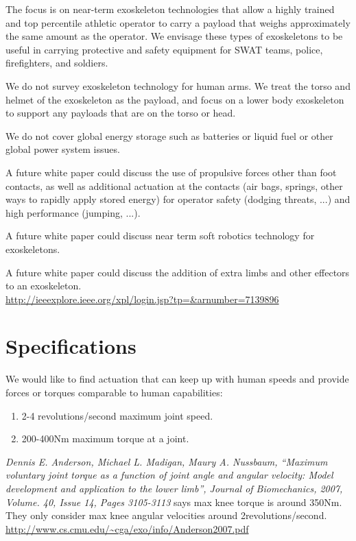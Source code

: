 \documentclass[letterpaper,12pt,fullpage]{article}
\begin{document}
The focus is on near-term exoskeleton technologies that allow a
highly trained and top percentile athletic 
operator to carry a payload that weighs approximately the same amount
as the operator. We envisage these types of exoskeletons to be useful
in carrying protective and safety equipment for SWAT teams, police,
firefighters, and soldiers. 

We do not survey exoskeleton technology for human arms. 
We treat the torso and helmet of the exoskeleton as the payload,
and focus on a lower body exoskeleton to support any payloads that
are on the torso or head.

We do not cover global energy storage such as batteries or liquid fuel
or other global power system issues.

A future white paper could discuss the use of propulsive forces other
than foot contacts, as well as additional actuation at the contacts (air
bags, springs, other ways to rapidly apply stored energy) for
operator safety (dodging threats, ...) and high performance (jumping, ...).

A future white paper could discuss near term soft robotics technology
for exoskeletons.

A future white paper could discuss the addition of extra limbs and
other effectors to an exoskeleton.\\
\url{http://ieeexplore.ieee.org/xpl/login.jsp?tp=&arnumber=7139896}\\


%


\section{Specifications}

We would like to find actuation that can keep up with human
speeds and provide forces or torques comparable to human capabilities:
\begin{enumerate}
\item
2-4 revolutions/second maximum joint speed.
\item
200-400Nm maximum torque at a joint.
\end{enumerate}

{\it Dennis E. Anderson, Michael L. Madigan, Maury A. Nussbaum,
“Maximum voluntary joint torque as a function of joint angle and
angular velocity: Model development and application to the lower
limb”, Journal of Biomechanics, 2007, Volume. 40, Issue 14, Pages
3105-3113} says max knee torque is around 350Nm. They only consider
max knee angular velocities around 2revolutions/second.\\
\url{http://www.cs.cmu.edu/~cga/exo/info/Anderson2007.pdf}
\end{document}
